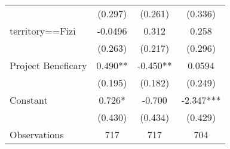 {\begin{tabular}{l*{3}{c}}
                    &     (0.297)   &     (0.261)   &     (0.336)   \\
[1em]
territory==Fizi     &     -0.0496   &       0.312   &       0.258   \\
                    &     (0.263)   &     (0.217)   &     (0.296)   \\
[1em]
Project Beneficary  &       0.490** &      -0.450** &      0.0594   \\
                    &     (0.195)   &     (0.182)   &     (0.249)   \\
[1em]
Constant            &       0.726*  &      -0.700   &      -2.347***\\
                    &     (0.430)   &     (0.434)   &     (0.429)   \\
\hline
Observations        &         717   &         717   &         704   \\
\hline\hline
\end{tabular}
}
